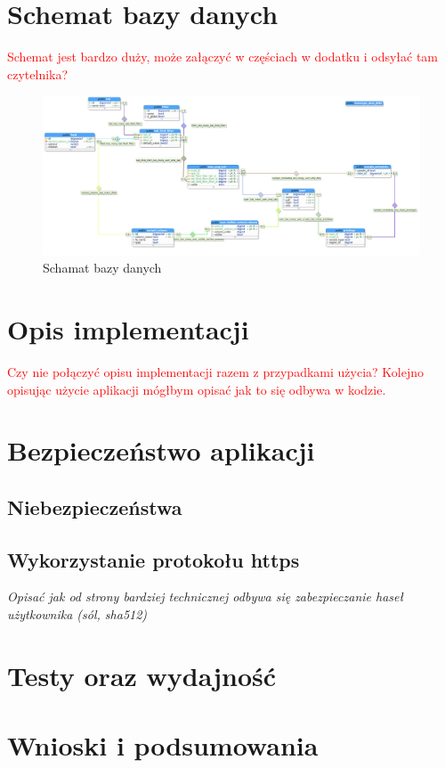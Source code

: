 \documentclass[a4paper,12pt,twoside]{article}
\begin{document}
\section{Schemat bazy danych}
\textcolor{red}{
Schemat jest bardzo duży, może załączyć w częściach w dodatku i odsyłać tam czytelnika?
}
\begin{figure}[h!]
  \includegraphics[width=\linewidth]{obrazy/database.png}
  \caption{Schamat bazy danych}
  \label{fig:bazadanych}
\end{figure}

\newpage
\section{Opis implementacji}  
\textcolor{red}{
Czy nie połączyć opisu implementacji razem z przypadkami użycia?
Kolejno opisując użycie aplikacji mógłbym opisać jak to się odbywa w kodzie.
}
\newpage
\section{Bezpieczeństwo aplikacji}  
\subsection{Niebezpieczeństwa}
\subsection{Wykorzystanie protokołu https}
\textit{Opisać jak od strony bardziej technicznej odbywa się zabezpieczanie haseł użytkownika (sól, sha512) }
\newpage
\section{Testy oraz wydajność}  
\newpage
\section{Wnioski i podsumowania}  
\end{document}
